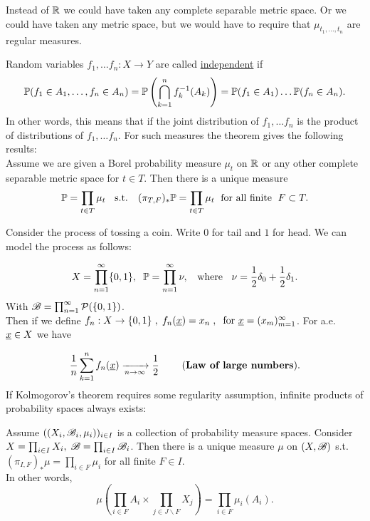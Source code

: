 \begin{remark}
    Instead of $\mathbb{R}$ we could have taken any complete separable metric space. Or we could have taken any metric space, but we would have to require that $\mu_{t_1,\ldots,t_n}$ are regular measures. 
\end{remark}


\begin{definition}
    Random variables $f_1,\ldots f_n:X\rightarrow Y$ are called \underline{independent} if 
    \[\mathbb{P}(f_1\in A_1,\ldots, f_n\in A_n)=\mathbb{P}\left(\bigcap_{k=1}^n f_k^{-1}(A_k)\right)=\mathbb{P}(f_1\in A_1)\ldots\mathbb{P}(f_n\in A_n).\]
    In other words, this means that if the joint distribution of $f_1,\ldots f_n$ is the product of distributions of $f_1,\ldots f_n$.
    For such measures the theorem gives the following results: \\[4mm]
    Assume we are given a Borel probability measure $\mu_t$ on $\mathbb{R}$ or any other complete separable metric space for $t\in T$. Then there is a unique measure 
    \[\mathbb{P} = \prod_{t\in T}\mu_t\hspace{2mm} \text{  s.t.  }\hspace{2mm} (\pi_{T,F})_*\mathbb{P} = \prod_{t\in T}\mu_t \hspace{1mm} \text{  for all finite  }\hspace{1mm} F\subset T.\]
\end{definition}

\begin{example}
    Consider the process of tossing a coin. Write $0$ for tail and $1$ for head. We can model the process as follows:

    \[X = \prod_{n=1}^\infty \{0,1\},\hspace{2mm} \mathbb{P} = \prod_{n=1}^\infty \nu,\hspace{2mm} \text{ where }\hspace{2mm} \nu = \frac{1}{2}\delta_0+\frac{1}{2}\delta_1.\]
    With $\mathscr{B} = \prod_{n=1}^\infty \mathcal P (\{0,1\})$.\\[3mm]
    Then if we define $f_n:X\rightarrow \{0,1\}\hspace{1mm},\hspace{1mm} f_n(\underline{x})=x_n\hspace{1mm},\hspace{2mm} \text{for } \underline{x}=(x_m)_{m=1}^\infty$.
    For a.e. $\underline{x}\in X$ we have 

    \[\frac{1}{n}\sum_{k=1}^n f_{n}(\underline{x})\xrightarrow[n\rightarrow\infty]{}\frac{1}{2} \hspace{8mm} (\textbf{Law of large numbers}).\]
    If Kolmogorov's theorem requires some regularity assumption, infinite products of probability spaces always exists:
\end{example}


\begin{theorem}
    Assume $((X_i,\mathscr{B}_i,\mu_i))_{i\in I}$ is a collection of probability measure spaces. Consider $X=\prod_{i\in I} X_i,\hspace{1mm} \mathscr{B}=\prod_{i\in I}\mathscr{B}_i$. Then there is a unique measure $\mu$
    on $(X,\mathscr{B})$ s.t. $(\pi_{I,F})_*\mu = \prod_{i\in F}\mu_i$ for all finite $F\in I$.\\[2mm]
    In other words, 
    \[\mu\left(\prod_{i\in F}A_i\times \prod_{j\in J\backslash F}X_j\right) = \prod_{i\in F}\mu_i(A_i).\]
\end{theorem}


